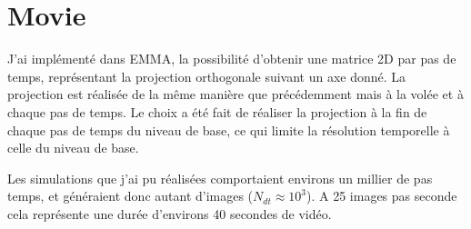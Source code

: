%
%
%
%
%
%
%
%




\section{Movie}

J'ai implémenté dans EMMA, la possibilité d'obtenir une matrice 2D par pas de temps, représentant la projection orthogonale suivant un axe donné.
La projection est réalisée de la même manière que précédemment mais à la volée et à chaque pas de temps.
Le choix a été fait de réaliser la projection à la fin de chaque pas de temps du niveau de base, ce qui limite la résolution temporelle à celle du niveau de base.


Les simulations que j'ai pu réalisées comportaient environs un millier de pas temps, et généraient donc autant d'images ($N_{dt} \approx 10^3$).
A 25 images pas seconde cela représente une durée d'environs 40 secondes de vidéo.

